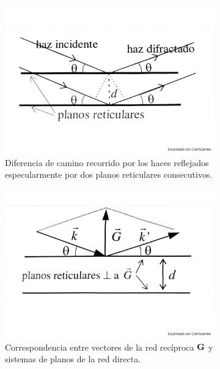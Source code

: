 \begin{figure}[h!] \centering
\begin{subfigure}{0.43\linewidth} \centering
    \includegraphics[scale=0.3]{Cuerpo/Ch_02/Fotos_libro 6.pdf}
    \caption{Diferencia de camino recorrido por los haces reflejados especularmente por dos planos reticulares consecutivos.}
    \label{Fig:02-06}
\end{subfigure}    
\begin{subfigure}{0.43\linewidth} \centering
    \includegraphics[scale=0.3]{Cuerpo/Ch_02/Fotos_libro 7.pdf}
    \caption{Correspondencia entre vectores de la red recíproca $\mathbf{G}$ y sistemas de planos de la red directa.}
    \label{Fig:02-07}
\end{subfigure}
\caption{}
\end{figure}


